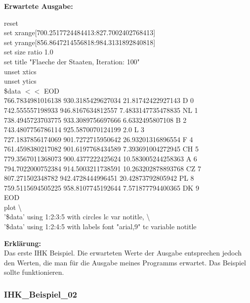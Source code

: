 \documentclass[a4paper,11pt]{article}
\begin{document}
{\vspace{5mm}
	\textbf{Erwartete Ausgabe:}
	\begin{mdframed}[linewidth=0pt, backgroundcolor=background, innertopmargin=10pt, innerbottommargin=10pt]
		reset\\
		set xrange[700.2517724484413:827.7002402768413]\\
		set yrange[856.8647214556818:984.3131892840818]\\
		set size ratio 1.0\\
		set title "Flaeche der Staaten, Iteration: 100"\\
		unset xtics\\
		unset ytics\\
		\$data $<<$ EOD\\
		766.7834981016138 930.3185429627034 21.81742422927143 D 0\\
		742.555557198933 946.8167634812557 7.4833147735478835 NL 1\\
		738.4945723703775 933.3089756697666 6.6332495807108 B 2\\
		743.4807756786114 925.5870070124199 2.0 L 3\\
		727.1837856174069 901.7272715950642 26.93201316896554 F 4\\
		761.4598380217082 901.6197768434589 7.393691004272945 CH 5\\
		779.3567011368073 900.4377222425624 10.583005244258363 A 6\\
		794.7022000752384 914.5003211738591 10.263202878893768 CZ 7\\
		807.271502348782 942.4728444996451 20.42873792805942 PL 8\\
		759.5115694505225 958.8107745192644 7.571877794400365 DK 9\\
		EOD\\
		plot \textbackslash \\
		'\$data' using 1:2:3:5 with circles lc var notitle, \textbackslash \\
		'\$data' using 1:2:4:5 with labels font "arial,9" tc variable notitle
\end{mdframed}

\vspace{5mm}
\textbf{Erkl\"arung:}\\
Das erste IHK Beispiel. Die erwarteten Werte der Ausgabe entsprechen jedoch den Werten, die man f\"ur die Ausgabe meines Programms erwartet.
Das Beispiel sollte funktionieren.\\

\subsubsection{IHK\_Beispiel\_02}

}
\end{document}
